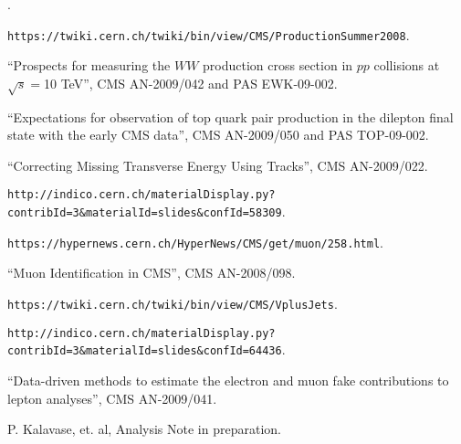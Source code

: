 \begin{thebibliography}{99}

.

 {\tt https://twiki.cern.ch/twiki/bin/view/CMS/ProductionSummer2008}.

 {``Prospects for measuring the $WW$ production cross section in $pp$ collisions at $\sqrt s = $10 TeV''}, CMS AN-2009/042 and PAS EWK-09-002.

 {``Expectations for observation of top quark pair production in the dilepton final state with the early CMS data''}, CMS AN-2009/050 and PAS TOP-09-002.

 {``Correcting Missing Transverse Energy Using Tracks''}, CMS AN-2009/022.

 {\tt http://indico.cern.ch/materialDisplay.py?contribId=3\&materialId=slides\&confId=58309}.

 {\tt https://hypernews.cern.ch/HyperNews/CMS/get/muon/258.html}.

 {``Muon Identification in CMS''}, CMS AN-2008/098.

 {\tt https://twiki.cern.ch/twiki/bin/view/CMS/VplusJets}.

 {\tt http://indico.cern.ch/materialDisplay.py?contribId=3\&materialId=slides\&confId=64436}.

 {``Data-driven methods to estimate the electron and muon fake contributions to lepton analyses''}, CMS AN-2009/041.

 P. Kalavase, et. al, Analysis Note in preparation.

\end{thebibliography}








